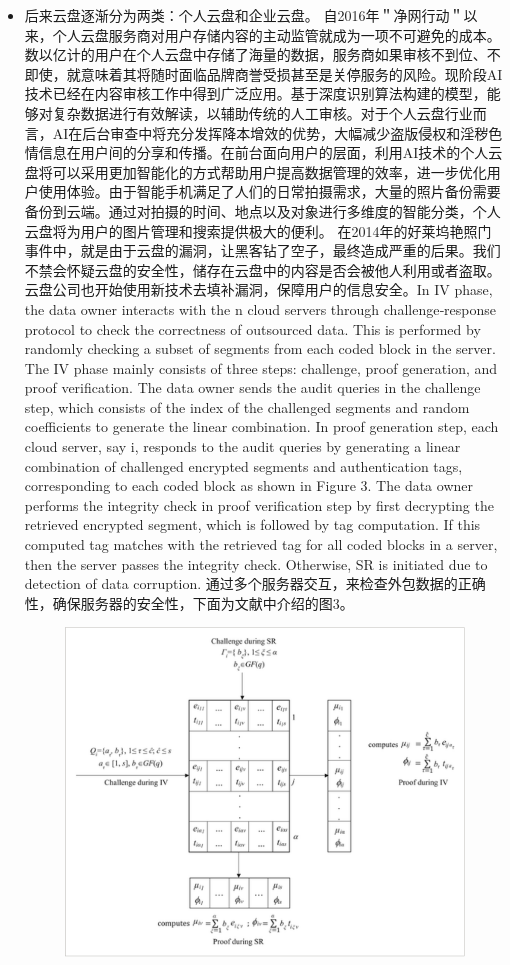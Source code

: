 \documentclass{article}
\begin{document}
\begin{itemize}
    \item 后来云盘逐渐分为两类：个人云盘和企业云盘。
    自2016年＂净网行动＂以来，个人云盘服务商对用户存储内容的主动监管就成为一项不可避免的成本。数以亿计的用户在个人云盘中存储了海量的数据，服务商如果审核不到位、不即使，就意味着其将随时面临品牌商誉受损甚至是关停服务的风险。现阶段AI技术已经在内容审核工作中得到广泛应用。基于深度识别算法构建的模型，能够对复杂数据进行有效解读，以辅助传统的人工审核。对于个人云盘行业而言，AI在后台审查中将充分发挥降本增效的优势，大幅减少盗版侵权和淫秽色情信息在用户间的分享和传播。在前台面向用户的层面，利用AI技术的个人云盘将可以采用更加智能化的方式帮助用户提高数据管理的效率，进一步优化用户使用体验。由于智能手机满足了人们的日常拍摄需求，大量的照片备份需要备份到云端。通过对拍摄的时间、地点以及对象进行多维度的智能分类，个人云盘将为用户的图片管理和搜索提供极大的便利。\cite{gerenyunpan}
在2014年的好莱坞艳照门事件中，就是由于云盘的漏洞，让黑客钻了空子，最终造成严重的后果。我们不禁会怀疑云盘的安全性，储存在云盘中的内容是否会被他人利用或者盗取。云盘公司也开始使用新技术去填补漏洞，保障用户的信息安全。In IV phase, the data owner interacts with the n cloud servers through challenge‐response protocol to check the correctness of outsourced data. This is performed by randomly checking a subset of segments from each coded block in the server. The IV phase mainly consists of three steps: challenge, proof generation, and proof verification. The data owner sends the audit queries in the challenge step, which consists of the index of the challenged segments and random coefficients to generate the linear combination. In proof generation step, each cloud server, say i, responds to the audit queries by generating a linear combination of challenged encrypted segments and authentication tags, corresponding to each coded block as shown in Figure 3. The data owner performs the integrity check in proof verification step by first decrypting the retrieved encrypted segment, which is followed by tag computation. If this computed tag matches with the retrieved tag for all coded blocks in a server, then the server passes the integrity check. Otherwise, SR is initiated due to detection of data corruption.\cite{anquan}
    通过多个服务器交互，来检查外包数据的正确性，确保服务器的安全性，下面为文献中介绍的图3。
    \begin{figure}[H]
    	\centering
    	\includegraphics[width=0.7\linewidth]{图3}
    	\caption{}
    	\label{fig:3}
    \end{figure}
    

\end{itemize}
\end{document}
